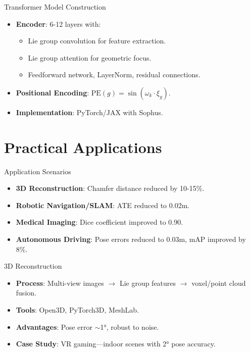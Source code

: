 \documentclass{beamer}
\begin{document}
\begin{frame}{Transformer Model Construction}
  \begin{itemize}
    \item<1-> \textbf{Encoder}: 6-12 layers with:
      \begin{itemize}
        \item<2-> Lie group convolution for feature extraction.
        \item<3-> Lie group attention for geometric focus.
        \item<4-> Feedforward network, LayerNorm, residual connections.
      \end{itemize}
    \item<5-> \textbf{Positional Encoding}: $\text{PE}(g) = \sin(\omega_k \cdot \xi_g)$.
    \item<6-> \textbf{Implementation}: PyTorch/JAX with Sophus.
  \end{itemize}
\end{frame}

\section{Practical Applications}
\begin{frame}{Application Scenarios}
  \begin{itemize}
    \item<1-> \textbf{3D Reconstruction}: Chamfer distance reduced by 10-15\%.
    \item<2-> \textbf{Robotic Navigation/SLAM}: ATE reduced to 0.02m.
    \item<3-> \textbf{Medical Imaging}: Dice coefficient improved to 0.90.
    \item<4-> \textbf{Autonomous Driving}: Pose errors reduced to 0.03m, mAP improved by 8\%.
  \end{itemize}
  \begin{center}
  \end{center}
\end{frame}

\begin{frame}{3D Reconstruction}
  \begin{itemize}
    \item<1-> \textbf{Process}: Multi-view images $\to$ Lie group features $\to$ voxel/point cloud fusion.
    \item<2-> \textbf{Tools}: Open3D, PyTorch3D, MeshLab.
    \item<3-> \textbf{Advantages}: Pose error $\sim$1°, robust to noise.
    \item<4-> \textbf{Case Study}: VR gaming—indoor scenes with 2° pose accuracy.
  \end{itemize}
\end{frame}
\end{document}
